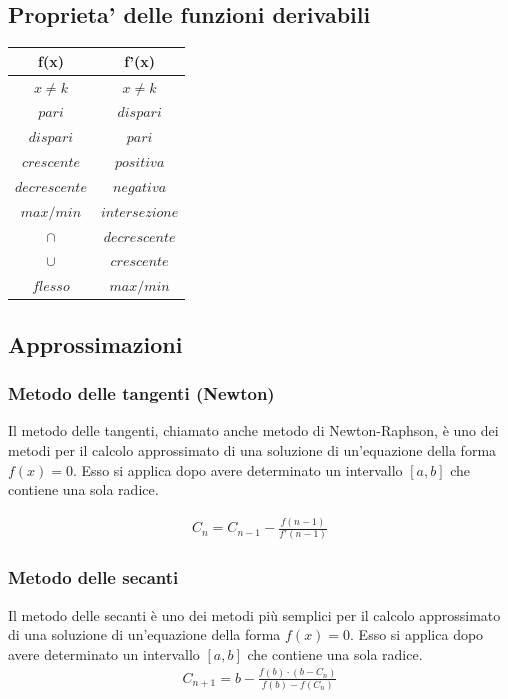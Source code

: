 \documentclass[a4paper]{article}
\begin{document}
	\subsection{Proprieta' delle funzioni derivabili}
	\begin{center}
		\begin{tabular}{c|c}
		 
		\textbf{f(x)} & \textbf{f'(x)} \\ 
		\hline 
		$x \ne k$ & $x \ne k$ \\ 
		$pari$ & $dispari$ \\ 
		$dispari$ & $pari$ \\ 
		$crescente$ & $positiva$ \\ 
		$decrescente$ & $negativa$ \\ 
		$max/min$ & $intersezione$ \\ 
		$\cap$	&	$decrescente$ \\
		$\cup$	&	$crescente$	\\
		$flesso$ & $max/min$	\\
		\end{tabular} 
	\end{center}
	
	\subsection{Approssimazioni}
	\subsubsection{Metodo delle tangenti (Newton)}
	Il metodo delle tangenti, chiamato anche metodo di Newton-Raphson, è uno dei metodi per il calcolo approssimato di una soluzione di un'equazione della forma $f(x)=0$. Esso si applica dopo avere determinato un intervallo $[a,b]$ che contiene una sola radice.
	
	\begin{align*}
		C_n = C_{n-1}-\frac{f(n-1)}{f'(n-1)}
	\end{align*}
	\subsubsection{Metodo delle secanti}
	Il metodo delle secanti è uno dei metodi più semplici per il calcolo approssimato di una soluzione di un'equazione della forma $f(x)=0$. Esso si applica dopo avere determinato un intervallo $[a,b]$ che contiene una sola radice.
	\begin{align*}
		C_{n+1} = b-\frac{f(b)\cdot (b-C_n)}{f(b)-f(C_n)}
	\end{align*}
	
\end{document}
